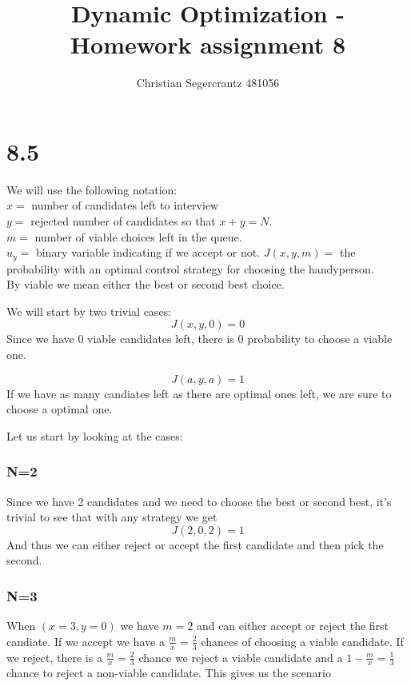 \documentclass{article}
\title{Dynamic Optimization - Homework assignment 8}
\author{Christian Segercrantz 481056}
\begin{document}
	\maketitle
	\pagebreak

\section*{8.5}

We will use the following notation: \\
$ x = $ number of candidates left to interview\\
$ y = $ rejected number of candidates so that $x+y = N$. \\
$ m = $ number of viable choices left in the queue. \\
$ u_y =$ binary variable indicating if we accept or not.
$ J(x, y,m) = $ the probability with an optimal control strategy for choosing the handyperson. \\
By viable we mean either the best or second best choice.

We will start by two trivial cases:
\begin{equation}
	J(x,y,0) = 0
\end{equation}
Since we have 0 viable candidates left, there is 0 probability to choose a viable one. 

\begin{equation}
	J(a,y,a) = 1
\end{equation}
If we have as many candiates left as there are optimal ones left, we are sure to choose a optimal one. 

Let us start by looking at the cases:

\subsubsection*{N=2}

Since we have 2 candidates and we need to choose the best or second best, it's trivial to see that with any strategy we get
\begin{equation}
	J(2,0,2) = 1 
\end{equation}
And thus we can either reject or accept the first candidate and then pick the second.

\subsubsection*{N=3}

When $(x=3,y=0)$ we have $m=2$ and can either accept or reject the first candiate. If we accept we have a $\frac{m}{x} = \frac{2}{3}$ chances of choosing a viable candidate. If we reject, there is a $\frac{m}{x} = \frac{2}{3}$ chance we reject a viable candidate and a $1-\frac{m}{x} = \frac{1}{3}$ chance to reject a non-viable candidate. This gives us the scenario
\end{document}
